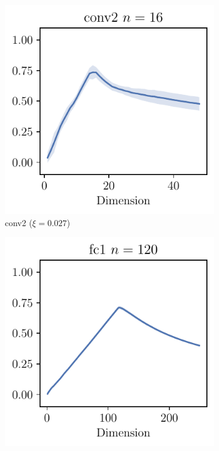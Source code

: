 \begin{figure}[th]
    \centering
    \begin{subfigure}[b]{0.32\textwidth}
        \centering
        \captionsetup{justification=centering}
        \includegraphics[width=\textwidth]{Figures/SubspaceOverlap/LeNet5_fixlr0.01/DimOverlap_CIFAR10_LeNet5_fixlr0.01_conv2.pdf}
        \caption{conv2 ($\xi = 0.027$)}
        \label{fig:Overlap_conv2}
    \end{subfigure}
    \begin{subfigure}[b]{0.32\textwidth}
        \centering
        \captionsetup{justification=centering}
        \includegraphics[width=\textwidth]{Figures/SubspaceOverlap/LeNet5_fixlr0.01/DimOverlap_CIFAR10_LeNet5_fixlr0.01_fc1.pdf}

\end{subfigure}
\end{figure}
